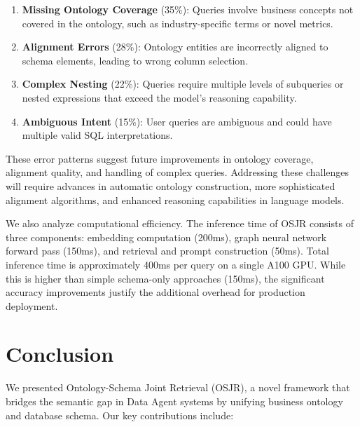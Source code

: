 \documentclass[sigconf, nonatbib]{acmart}
\begin{document}
\begin{enumerate}
    \item \textbf{Missing Ontology Coverage} (35\%): Queries involve business concepts not covered in the ontology, such as industry-specific terms or novel metrics.
    
    \item \textbf{Alignment Errors} (28\%): Ontology entities are incorrectly aligned to schema elements, leading to wrong column selection.
    
    \item \textbf{Complex Nesting} (22\%): Queries require multiple levels of subqueries or nested expressions that exceed the model's reasoning capability.
    
    \item \textbf{Ambiguous Intent} (15\%): User queries are ambiguous and could have multiple valid SQL interpretations.
\end{enumerate}

These error patterns suggest future improvements in ontology coverage, alignment quality, and handling of complex queries. Addressing these challenges will require advances in automatic ontology construction, more sophisticated alignment algorithms, and enhanced reasoning capabilities in language models.

We also analyze computational efficiency. The inference time of OSJR consists of three components: embedding computation (200ms), graph neural network forward pass (150ms), and retrieval and prompt construction (50ms). Total inference time is approximately 400ms per query on a single A100 GPU. While this is higher than simple schema-only approaches (150ms), the significant accuracy improvements justify the additional overhead for production deployment.

\section{Conclusion}
\label{sec:conclusion}

We presented Ontology-Schema Joint Retrieval (OSJR), a novel framework that bridges the semantic gap in Data Agent systems by unifying business ontology and database schema. Our key contributions include:
\end{document}
